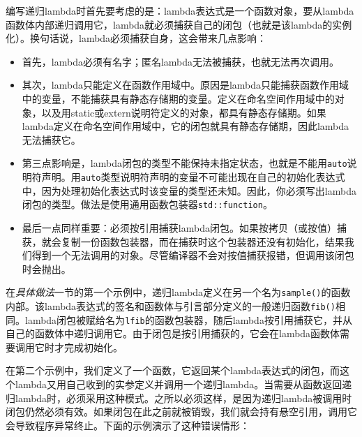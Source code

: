 
编写递归lambda时首先要考虑的是：lambda表达式是一个函数对象，要从lambda函数体内部递归调用它，lambda就必须捕获自己的闭包（也就是该lambda的实例化）。换句话说，lambda必须捕获自身，这会带来几点影响：



\begin{itemize}
\item 首先，lambda必须有名字；匿名lambda无法被捕获，也就无法再次调用。



\item 其次，lambda只能定义在函数作用域中。原因是lambda只能捕获函数作用域中的变量，不能捕获具有静态存储期的变量。定义在命名空间作用域中的对象，以及用static或extern说明符定义的对象，都具有静态存储期。如果lambda定义在命名空间作用域中，它的闭包就具有静态存储期，因此lambda无法捕获它。



\item 第三点影响是，lambda闭包的类型不能保持未指定状态，也就是不能用\texttt{auto}说明符声明。用\texttt{auto}类型说明符声明的变量不可能出现在自己的初始化表达式中，因为处理初始化表达式时该变量的类型还未知。因此，你必须写出lambda闭包的类型。做法是使用通用函数包装器\texttt{std::\allowbreak{}function}。



\item 最后一点同样重要：必须按引用捕获lambda闭包。如果按拷贝（或按值）捕获，就会复制一份函数包装器，而在捕获时这个包装器还没有初始化，结果我们得到一个无法调用的对象。尽管编译器不会对按值捕获报错，但调用该闭包时会抛出。

\end{itemize}



在\textit{具体做法}一节的第一个示例中，递归lambda定义在另一个名为\texttt{sample()}的函数内部。该lambda表达式的签名和函数体与引言部分定义的一般递归函数\texttt{fib()}相同。lambda闭包被赋给名为\texttt{lfib}的函数包装器，随后lambda按引用捕获它，并从自己的函数体中递归调用它。由于闭包是按引用捕获的，它会在lambda函数体需要调用它时才完成初始化。



在第二个示例中，我们定义了一个函数，它返回某个lambda表达式的闭包，而这个lambda又用自己收到的实参定义并调用一个递归lambda。当需要从函数返回递归lambda时，必须采用这种模式。之所以必须这样，是因为递归lambda被调用时闭包仍然必须有效。如果闭包在此之前就被销毁，我们就会持有悬空引用，调用它会导致程序异常终止。下面的示例演示了这种错误情形：


